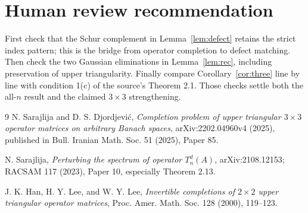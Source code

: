 \documentclass[11pt]{article}
\begin{document}
\section{Human review recommendation}

First check that the Schur complement in Lemma~\ref{lem:defect} retains the
strict index pattern; this is the bridge from operator completion to defect
matching.  Then check the two Gaussian eliminations in Lemma~\ref{lem:rec},
including preservation of upper triangularity.  Finally compare
Corollary~\ref{cor:three} line by line with condition 1(c) of the source's
Theorem 2.1.  Those checks settle both the all-$n$ result and the claimed
$3\times3$ strengthening.

\begin{thebibliography}{9}
N. Sarajlija and D. S. Djordjevi\'c,
\emph{Completion problem of upper triangular $3\times3$ operator matrices
on arbitrary Banach spaces}, arXiv:2202.04960v4 (2025), published in
Bull. Iranian Math. Soc. 51 (2025), Paper 85.

N. Sarajlija,
\emph{Perturbing the spectrum of operator $T_n^d(A)$},
arXiv:2108.12153; RACSAM 117 (2023), Paper 10, especially Theorem 2.13.

J. K. Han, H. Y. Lee, and W. Y. Lee,
\emph{Invertible completions of $2\times2$ upper triangular operator
matrices}, Proc. Amer. Math. Soc. 128 (2000), 119--123.
\end{thebibliography}
\end{document}

